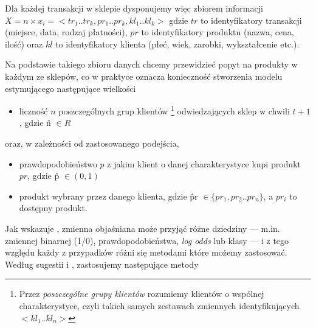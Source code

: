 \documentclass[polish, twoside, 12pt, a4paper]{article}
\theoremstyle{definition}
\theoremstyle{plain}
\theoremstyle{remark}
\begin{document}
Dla każdej transakcji w sklepie dysponujemy więc zbiorem informacji $ X = n \times x_i = <tr_1..tr_k, pr_1.. pr_k,kl_1..kl_k>$ gdzie $tr$ to identyfikatory transakcji (miejsce, data, rodzaj płatności), $pr$ to identyfikatory produktu (nazwa, cena, ilość) oraz $kl$ to identyfikatory klienta (płeć, wiek, zarobki, wykształcenie etc.). 

Na podstawie takiego zbioru danych chcemy przewidzieć popyt na produkty w każdym ze sklepów, co w praktyce oznacza konieczność stworzenia modelu estymującego następujące wielkości

	\begin{itemize} 
		\item liczność $n$ poszczególnych grup klientów \footnote{Przez \textit{poszczególne grupy klientów} rozumiemy klientów o wspólnej charakterystyce, czyli takich samych zestawach zmiennych identyfikujących $<kl_1..kl_n>$} odwiedzających sklep w chwili $t+1$, gdzie \^n $\in R$ 
	\end{itemize}
	oraz, w zależności od zastosowanego podejścia,
	\begin{itemize} 
		\item prawdopodobieństwo $p$ z jakim klient o danej charakterystyce kupi produkt $pr$, gdzie \^{p} $\in (0,1)$  
		\item produkt wybrany przez danego klienta, gdzie \^{pr} $\in \{pr_1,pr_2..pr_n\}$, a $pr_i$ to dostępny produkt.
	\end{itemize}

Jak wskazuje \cite{James2013}, zmienna objaśniana może przyjąć różne dziedziny --- m.in. zmiennej binarnej (1/0), prawdopodobieństwa, \textit{log odds} lub klasy --- i z tego względu każdy z przypadków różni się metodami które możemy zastosować. Według sugestii \cite{James2013} i \cite{hastie2001} , zastosujemy następujące metody
\end{document}
